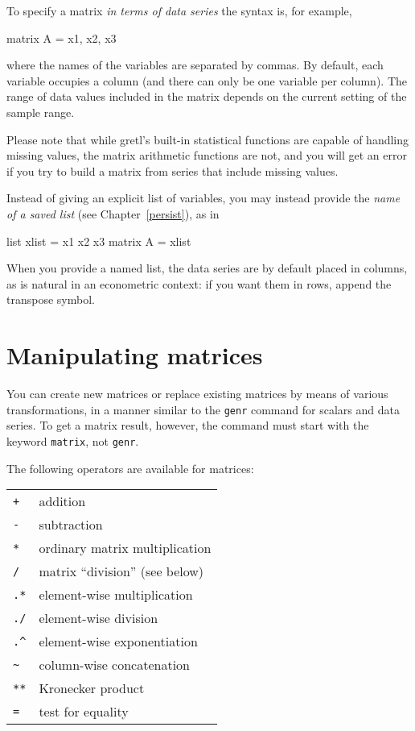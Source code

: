 To specify a matrix \textit{in terms of data series} the syntax is,
for example,
%
\begin{code}
matrix A = { x1, x2, x3 }
\end{code}
%
where the names of the variables are separated by commas.  By default,
each variable occupies a column (and there can only be one variable
per column).  The range of data values included in the matrix depends
on the current setting of the sample range.

Please note that while gretl's built-in statistical functions are
capable of handling missing values, the matrix arithmetic functions
are not, and you will get an error if you try to build a matrix from
series that include missing values.

Instead of giving an explicit list of variables, you may instead
provide the \textit{name of a saved list} (see Chapter~\ref{persist}),
as in
%
\begin{code}
list xlist = x1 x2 x3
matrix A = { xlist }
\end{code}
%
When you provide a named list, the data series are by default placed
in columns, as is natural in an econometric context: if you want them
in rows, append the transpose symbol.

\section{Manipulating matrices}
\label{matrix-manip}

You can create new matrices or replace existing matrices by means of
various transformations, in a manner similar to the \texttt{genr}
command for scalars and data series.  To get a matrix result, however,
the command must start with the keyword \texttt{matrix}, not
\texttt{genr}.

The following operators are available for matrices:

\begin{center}
\begin{tabular}{ll}
\texttt{+} & addition \\
\texttt{-} & subtraction \\
\texttt{*} & ordinary matrix multiplication \\
\texttt{/} & matrix ``division'' (see below) \\
\texttt{.*} & element-wise multiplication \\
\texttt{./} & element-wise division \\
\verb+.^+ & element-wise exponentiation \\
\verb+~+ & column-wise concatenation \\
\texttt{**} & Kronecker product \\
\texttt{=} & test for equality 
\end{tabular}
\end{center}

